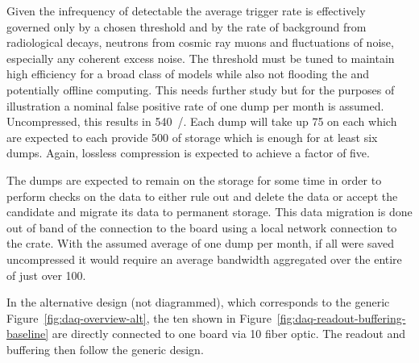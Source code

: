 Given the infrequency of detectable  the average
 trigger rate is effectively governed only by a chosen
threshold and by the rate of background from radiological decays,
neutrons from cosmic ray muons and fluctuations of noise, especially
any coherent excess noise. 
The threshold must be tuned to maintain high efficiency for a broad
class of  models while also not flooding the  and
potentially offline computing. 
This needs further study but for the purposes of illustration a
nominal false positive rate of one  dump per month is
assumed. 
Uncompressed, this results in \SI{540}{\TB/\year}. 
Each dump will take up \SI{75}{\GB} on each  which are
expected to each provide \SI{500}{\GB} of storage which is enough for
at least six dumps.
Again, lossless compression is expected to achieve a factor of five.

The  dumps are expected to remain on the 
storage for some time in order to perform checks on the data to either
rule out and delete the data or accept the candidate and migrate its
data to permanent storage. 
This data migration is done out of band of the connection to the
 board using a local network connection to the
 crate. 
With the assumed average of one dump per month, if all were saved
uncompressed it would require an average bandwidth aggregated over the
entire  of just over \SI{100}{\Mbps}.

In the alternative   design (not diagrammed), which
corresponds to the generic Figure~\ref{fig:daq-overview-alt}, the ten
 shown in Figure~\ref{fig:daq-readout-buffering-baseline}
are directly connected to one  board via \SI{10}{\Gbps} fiber
optic.  The readout and buffering then follow the generic design.
